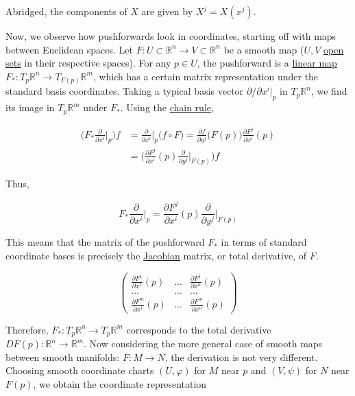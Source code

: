 \documentclass{article}
\begin{document}
    Abridged, the components of $X$ are given by $X^j = X(x^j)$. 

    Now, we observe how pushforwards look in coordinates, starting off with maps between Euclidean spaces. Let $F: U \subset \mathbb{R}^n \to V \subset \mathbb{R}^n$ be a smooth map ($U, V$ \hyperref[pst-def:open-set]{open sets} in their respective spaces). For any $p \in U$, the pushforward is a \hyperref[lin-def:linear_map]{linear map} $F_* : T_p \mathbb{R}^n \to T_{F(p)} \mathbb{R}^m$, which has a certain matrix representation under the standard basis coordinates. Taking a typical basis vector $\partial/\partial x^i \big|_p$ in $T_p \mathbb{R}^n$, we find its image in $T_p \mathbb{R}^m$ under $F_*$. Using the \hyperref[mv-thm:chain-rule]{chain rule}, 

    \begin{align*}
      \bigg( F_* \frac{\partial}{\partial x^i} \bigg|_p \bigg) f & = \frac{\partial}{\partial x^i} \bigg|_p \big( f \circ F \big) = \frac{\partial f}{\partial y^j} \big( F(p)\big) \frac{\partial F^j}{\partial x^i} (p) \\
      & = \bigg( \frac{\partial F^j}{\partial x^i} (p) \frac{\partial}{\partial y^j} \bigg|_{F(p)} \bigg) f 
    \end{align*}

    Thus, 

      \begin{equation}
        F_* \frac{\partial}{\partial x^i} \bigg|_p = \frac{\partial F^j}{\partial x^i} (p) \frac{\partial}{\partial y^j} \bigg|_{F(p)}
      \end{equation}

    This means that the matrix of the pushforward $F_*$ in terms of standard coordinate bases is precisely the \hyperref[mv-def:jacobian]{Jacobian} matrix, or total derivative, of $F$. 
    
      \begin{equation}
        \begin{pmatrix}
              \frac{\partial F^1}{\partial x^1} (p) & ... & \frac{\partial F^1}{\partial x^n} (p) \\
              ... & ... & ... \\
              \frac{\partial F^m}{\partial x^1} (p) & ... & \frac{\partial F^m}{\partial x^n} (p)
              \end{pmatrix}
      \end{equation}

    Therefore, $F_*: T_p \mathbb{R}^n \to T_p \mathbb{R}^m$ corresponds to the total derivative $D F (p): \mathbb{R}^n \to \mathbb{R}^m$. Now considering the more general case of smooth maps between smooth manifolds: $F: M \to N$, the derivation is not very different. Choosing smooth coordinate charts $(U, \varphi)$ for $M$ near $p$ and $(V, \psi)$ for $N$ near $F(p)$, we obtain the coordinate representation 
\end{document}
